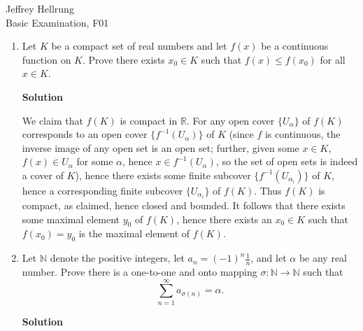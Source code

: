 \documentclass{article}
\begin{document}
\begin{flushright}
Jeffrey Hellrung \\
Basic Examination, F01 \\
\end{flushright}


\begin{enumerate}

\item Let \(K\) be a compact set of real numbers and let \(f(x)\) be a continuous function on \(K\).  Prove there exists \(x_0 \in K\) such that \(f(x) \leq f(x_0)\) for all \(x \in K\).

{\bf Solution}

We claim that \(f(K)\) is compact in \(\mathbb{R}\).  For any open cover \(\{U_{\alpha}\}\) of \(f(K)\) corresponds to an open cover \(\{f^{-1}(U_{\alpha})\}\) of \(K\) (since \(f\) is continuous, the inverse image of any open set is an open set; further, given some \(x \in K\), \(f(x) \in U_{\alpha}\) for some \(\alpha\), hence \(x \in f^{-1}(U_{\alpha})\), so the set of open sets is indeed a cover of \(K\)), hence there exists some finite subcover \(\{f^{-1}(U_{\alpha_i})\}\) of \(K\), hence a corresponding finite subcover \(\{U_{\alpha_i}\}\) of \(f(K)\).  Thus \(f(K)\) is compact, as claimed, hence closed and bounded.  It follows that there exists some maximal element \(y_0\) of \(f(K)\), hence there exists an \(x_0 \in K\) such that \(f(x_0) = y_0\) is the maximal element of \(f(K)\).



\item Let \(\mathbb{N}\) denote the positive integers, let \(a_n = (-1)^n \frac{1}{n}\), and let \(\alpha\) be any real number.  Prove there is a one-to-one and onto mapping \(\sigma : \mathbb{N} \to \mathbb{N}\) such that
\[\sum_{n = 1}^{\infty} a_{\sigma(n)} = \alpha.\]

{\bf Solution}


\end{enumerate}
\end{document}
